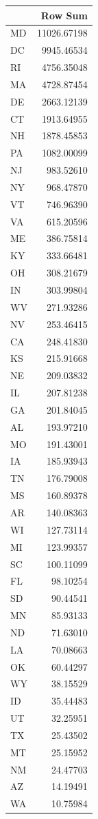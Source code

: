 \documentclass[
  a4paper,
]{article}
\begin{document}
\begin{longtable}[]{@{}lr@{}}
\toprule\noalign{}
& Row Sum \\
\midrule\noalign{}
\endhead
\bottomrule\noalign{}
\endlastfoot
MD & 11026.67198 \\
DC & 9945.46534 \\
RI & 4756.35048 \\
MA & 4728.87454 \\
DE & 2663.12139 \\
CT & 1913.64955 \\
NH & 1878.45853 \\
PA & 1082.00099 \\
NJ & 983.52610 \\
NY & 968.47870 \\
VT & 746.96390 \\
VA & 615.20596 \\
ME & 386.75814 \\
KY & 333.66481 \\
OH & 308.21679 \\
IN & 303.99804 \\
WV & 271.93286 \\
NV & 253.46415 \\
CA & 248.41830 \\
KS & 215.91668 \\
NE & 209.03832 \\
IL & 207.81238 \\
GA & 201.84045 \\
AL & 193.97210 \\
MO & 191.43001 \\
IA & 185.93943 \\
TN & 176.79008 \\
MS & 160.89378 \\
AR & 140.08363 \\
WI & 127.73114 \\
MI & 123.99357 \\
SC & 100.11099 \\
FL & 98.10254 \\
SD & 90.44541 \\
MN & 85.93133 \\
ND & 71.63010 \\
LA & 70.08663 \\
OK & 60.44297 \\
WY & 38.15529 \\
ID & 35.44483 \\
UT & 32.25951 \\
TX & 25.43502 \\
MT & 25.15952 \\
NM & 24.47703 \\
AZ & 14.19491 \\
WA & 10.75984 \\
\end{longtable}
\end{document}
